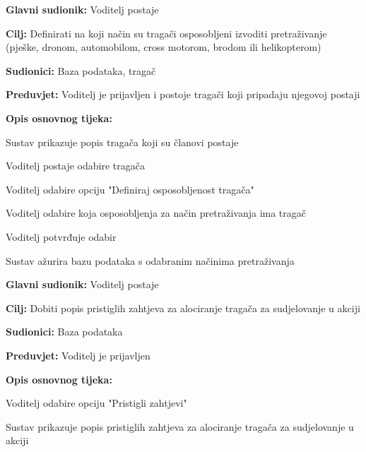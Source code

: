 \begin{packed_item}
\begin{packed_item}
						\item \textbf{Glavni sudionik:} Voditelj postaje
						\item \textbf{Cilj:} Definirati na koji način su tragači osposobljeni izvoditi pretraživanje (pješke, dronom, automobilom, cross motorom, brodom ili helikopterom)
						\item \textbf{Sudionici:} Baza podataka, tragač
						\item \textbf{Preduvjet:} Voditelj je prijavljen i postoje tragači koji pripadaju njegovoj postaji
						\item \textbf{Opis osnovnog tijeka:}
						
						\item[] \begin{packed_enum}
							
							\item Sustav prikazuje popis tragača koji su članovi postaje
							\item Voditelj postaje odabire tragača 
							\item Voditelj odabire opciju "Definiraj osposobljenost tragača" 
							\item Voditelj odabire koja osposobljenja za način pretraživanja ima tragač
							\item Voditelj potvrđuje odabir 
							\item Sustav ažurira bazu podataka s odabranim načinima pretraživanja
						\end{packed_enum}
					\end{packed_item}
					
					\noindent {}
					\begin{packed_item}
						
						\item \textbf{Glavni sudionik:} Voditelj postaje
						\item \textbf{Cilj:} Dobiti popis pristiglih zahtjeva za alociranje tragača za sudjelovanje u akciji
						\item \textbf{Sudionici:} Baza podataka
						\item \textbf{Preduvjet:} Voditelj je prijavljen
						\item \textbf{Opis osnovnog tijeka:}
						
						\item[] \begin{packed_enum}
							
							\item Voditelj odabire opciju "Pristigli zahtjevi"
							\item Sustav prikazuje popis pristiglih zahtjeva za alociranje tragača za sudjelovanje u akciji
						\end{packed_enum}
						

\end{packed_item}
\end{packed_item}
